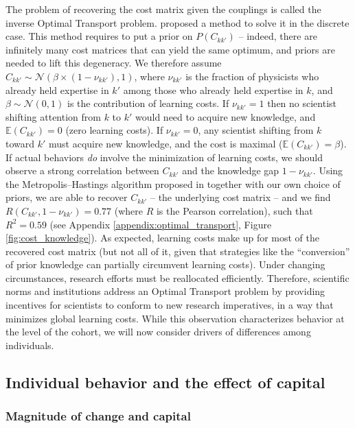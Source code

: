 \documentclass{article}
\begin{document}
The problem of recovering the cost matrix given the couplings is called the inverse Optimal Transport problem. \citet{Chu2021} proposed a method to solve it in the discrete case. This method requires to put a prior on $P(C_{kk'})$ -- indeed, there are infinitely many cost matrices that can yield the same optimum, and priors are needed to lift this degeneracy. We therefore assume $C_{kk'}\sim \mathcal{N}(\beta \times (1-\nu_{kk'}),1)$, where $\nu_{kk'}$ is the fraction of physicists who already held expertise in $k'$ among those who already held expertise in $k$, and $\beta\sim\mathcal{N}(0,1)$ is the contribution of learning costs. If $\nu_{kk'}=1$ then no scientist shifting attention from $k$ to $k'$ would need to acquire new knowledge, and $\mathbb{E}(C_{kk'})=0$ (zero learning costs). If $\nu_{kk'}=0$, any scientist shifting from $k$ toward $k'$ must acquire new knowledge, and the cost is maximal ($\mathbb{E}(C_{kk'})=\beta$). If actual behaviors \textit{do} involve the minimization of learning costs, we should observe a strong correlation between $C_{kk'}$ and the knowledge gap $1-\nu_{kk'}$.  Using the Metropolis–Hastings algorithm proposed in \citealt{Chu2021} together with our own choice of priors, we are able to recover $C_{kk'}$ -- the underlying cost matrix -- and we find $R(C_{kk'},1-\nu_{kk'})=0.77$ (where $R$ is the Pearson correlation), such that $R^2=0.59$ (see Appendix \ref{appendix:optimal_transport}, Figure \ref{fig:cost_knowledge}). As expected, learning costs make up for most of the recovered cost matrix (but 
 not all of it, given that strategies like the ``conversion'' of prior knowledge can partially circumvent learning costs). Under changing circumstances, research efforts must be reallocated efficiently. Therefore, scientific norms and institutions address an Optimal Transport problem by providing incentives for scientists to conform to new research imperatives, in a way that minimizes global learning costs. While this observation characterizes behavior at the level of the cohort, we will now consider drivers of differences among individuals. 

\subsection{\label{sec:magnitude}Individual behavior and the effect of capital}

\subsubsection{Magnitude of change and capital}
\end{document}
